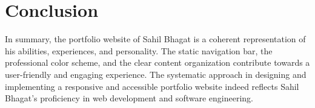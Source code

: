 \documentclass{article}
\begin{document}
\section{Conclusion}
In summary, the portfolio website of Sahil Bhagat is a coherent representation of his abilities, experiences, and personality. The static navigation bar, the professional color scheme, and the clear content organization contribute towards a user-friendly and engaging experience. The systematic approach in designing and implementing a responsive and accessible portfolio website indeed reflects Sahil Bhagat’s proficiency in web development and software engineering.
\end{document}
